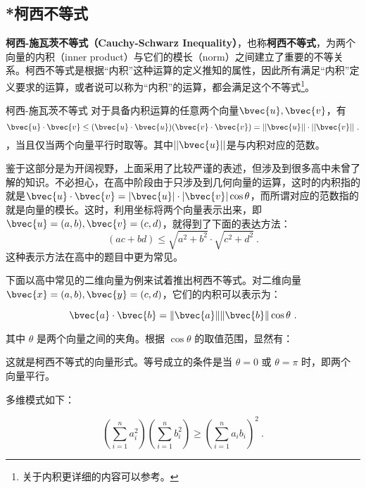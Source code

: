\subsection{*柯西不等式}


\textbf{柯西-施瓦茨不等式（Cauchy-Schwarz Inequality）}，也称\textbf{柯西不等式}，为两个向量的内积（inner product）与它们的模长（norm）之间建立了重要的不等关系。柯西不等式是根据“内积”这种运算的定义推知的属性，因此所有满足“内积”定义要求的运算，或者说可以称为“内积”的运算，都会满足这个不等式\footnote{关于内积更详细的内容可以参考。}。

\begin{theorem}{柯西-施瓦茨不等式}
对于具备内积运算的任意两个向量$\bvec{u},\bvec{v}$，有
\begin{equation}
\bvec{u} \cdot \bvec{v} \leq (\bvec{u}\cdot\bvec{u})(\bvec{v}\cdot\bvec{v})=||\bvec{u}||\cdot||\bvec{v}||~.
\end{equation}
，当且仅当两个向量平行时取等。其中$||\bvec{u}||$是与内积对应的范数。
\end{theorem}

鉴于这部分是为开阔视野，上面采用了比较严谨的表述，但涉及到很多高中未曾了解的知识。不必担心，在高中阶段由于只涉及到几何向量的运算，这时的内积指的就是$\bvec{u}\cdot\bvec{v}=|\bvec{u}|\cdot|\bvec{v}|\cos\theta$，而所谓对应的范数指的就是向量的模长。这时，利用坐标将两个向量表示出来，即$\bvec{u}=(a,b),\bvec{v}=(c,d)$，就得到了下面的表达方法：
\begin{equation}
\left( ac+bd \right)\leq\sqrt {a^2 + b^2}\cdot\sqrt{c^2 + d^2} ~.
\end{equation}
这种表示方法在高中的题目中更为常见。

下面以高中常见的二维向量为例来试着推出柯西不等式。对二维向量$\bvec{x}=(a,b),\bvec{y}=(c,d)$，它们的内积可以表示为：

$$\bvec{a} \cdot \bvec{b} = \|\bvec{a}\| \|\bvec{b}\| \cos \theta~.$$

其中 $\theta$ 是两个向量之间的夹角。根据 $\cos \theta$ 的取值范围，显然有：


这就是柯西不等式的向量形式。等号成立的条件是当 $\theta = 0$ 或 $\theta = \pi$ 时，即两个向量平行。





多维模式如下：

\begin{equation}
\left( \sum_{i=1}^{n} a_i^2 \right) \left( \sum_{i=1}^{n} b_i^2 \right) \geq \left( \sum_{i=1}^{n} a_i b_i \right)^2~.
\end{equation}

